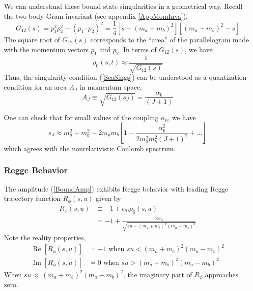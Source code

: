 We can understand these bound state singularities in a geometrical way. Recall the two-body Gram invariant (see appendix \ref{AppMomInva}),
\begin{equation}
	G_{12}(s) = p_{1}^{2} p_{2}^{2} - (p_{1} \cdot p_{2})^{2} = \frac{1}{4} [s - (m_{a} - m_{b})^{2}] [(m_{a} + m_{b})^{2} - s]
\end{equation}
The square root of $G_{12}(s)$ corresponds to the ``area'' of the parallelogram made with the momentum vectors $p_{1}$ and $p_{2}$. In terms of $G_{12}(s)$, we have
\begin{equation}
	\rho_{0}(s, t) \approx \frac{1}{\sqrt{G_{12}(s)}}
\end{equation}
Thus, the singularity condition (\ref{ScaSings}) can be understood as a quantization condition for an area $A_{J}$ in momentum space,
\begin{equation}
	A_{J} \equiv \sqrt{G_{12}(s_{J})} = \frac{\alpha_{0}}{(J+1)}
\end{equation}

One can check that for small values of the coupling $\alpha_{0}$, we have
\begin{equation}
	s_{J} \approx m_{a}^{2} + m_{b}^{2} + 2m_{a}m_{b} \left[1 - \frac{\alpha_{0}^{2}}{2m_{a}^{2} m_{b}^{2} (J+1)^{2}} + \ldots \right]
\end{equation}
which agrees with the nonrelativistic Coulomb spectrum.
\subsubsection{Regge Behavior}
The amplitude (\ref{BoundAmp}) exhibits Regge behavior with leading Regge trajectory function $R_{\phi}(s, u)$ given by
\begin{align}
	R_{\phi}(s, u) &\equiv - 1 + \alpha_{0} \rho_{0}(s, u) \nonumber \\
	&= -1 + \frac{2 \alpha_{0}}{\sqrt{s u - (m_{a} + m_{b})^{2} (m_{a} - m_{b})^{2}}}
\end{align}
Note the reality properties,
\begin{equation}
\begin{split}
	\operatorname{Re}{[R_{\phi}(s, u)]} &= -1 \text{ when } s u < (m_{a} + m_{b})^{2} (m_{a} - m_{b})^{2} \\
	\operatorname{Im}{[R_{\phi}(s, u)]} &= 0 \text{ when } s u > (m_{a} + m_{b})^{2} (m_{a} - m_{b})^{2}
\end{split}
\end{equation}
When $su \ll (m_{a} + m_{b})^{2} (m_{a} - m_{b})^{2} $, the imaginary part of $R_{\phi}$ approaches zero.

